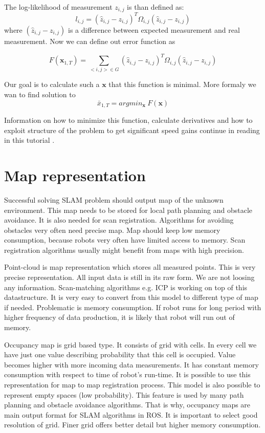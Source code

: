 The log-likelihood of measurement $z_{i,j}$ is than defined as:
\begin{equation}
l_{i,j} = (\hat{z}_{i,j} - z_{i,j})^{T} \Omega_{i,j} (\hat{z}_{i,j} - z_{i,j}) 
\end{equation}  
where $(\hat{z}_{i,j} - z_{i,j})$ is a difference between expected measurement and real measurement. Now we can define out error function as

\begin{equation}
F(\textbf{x}_{1,T}) = \sum_{<i,j>\in G}^{} (\hat{z}_{i,j} - z_{i,j})^{T} \Omega_{i,j} (\hat{z}_{i,j} - z_{i,j}) 
\end{equation}

Our goal is to calculate such a $\textbf{x}$ that this function is minimal. More formaly we wan to find solution to
\begin{equation}
\bar{x}_{1,T} = argmin_{\textbf{x}} \ F(\textbf{x})
\end{equation}

 Information on how to minimize this function, calculate derivatives and how to exploit structure of the problem to get significant speed gains continue in reading in this tutorial \cite{GraphTutorial}.

\newpage


\section{Map representation}
\label{MAP_REPRE}
Successful solving SLAM problem should output map of the unknown environment. This map needs to be stored for local path planning and obstacle avoidance. It is also needed for scan registration. Algorithms for avoiding obstacles very often need precise map. Map should keep low memory consumption, because robots very often have limited access to memory. Scan registration algorithms usually might benefit from maps with high precision.

Point-cloud is map representation which stores all measured points. This is very precise representation. All input data is still in its raw form. We are not loosing any information. Scan-matching algorithms e.g. \gls{ICP} is working on top of this datastructure. It is very easy to convert from this model to different type of map if needed. Problematic is memory consumption. If robot runs for long period with higher frequency of data production, it is likely that robot will run out of memory.

Occupancy map is grid based type. It consists of grid with cells. In every cell we have just one value describing probability that this cell is occupied. Value becomes higher with more incoming data measurements. It has constant memory consumption with respect to time of robot's run-time. It is possible to use this representation for map to map registration process. This model is also possible to represent empty spaces (low probability). This feature is used by many path planning and obstacle avoidance algorithms. That is why, occupancy maps are main output format for SLAM algorithms in ROS. It is important to select good resolution of grid. Finer grid offers better detail but higher memory consumption.

